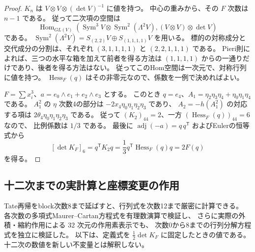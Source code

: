\begin{proof}
$K_n$ は $V\otimes V\otimes(\det V)^{-1}$ に値を持つ。
中心の重みから、その $F$ 次数は $n-1$ である。
従って二次項の空間は
\[
 \operatorname{Hom}_{GL(V)}
 \left(\operatorname{Sym}^3V\otimes
       \operatorname{Sym}^2(\Lambda^2V),
       (V\otimes V)\otimes\det V\right)
\]
である。
$\operatorname{Sym}^2(\Lambda^2V)=S_{(2,2)}V\oplus S_{(1,1,1,1)}V$ を用いる。
標的の対称成分と交代成分の分割は、それぞれ
$(3,1,1,1,1)$ と $(2,2,1,1,1)$ である。
Pieri則によれば、三つの水平な箱を加えて前者を得る方法は
$(1,1,1,1)$ からの一通りだけであり、後者を得る方法はない。
従ってこのHom空間は一次元で、対称行列に値を持つ。
$\operatorname{Hess}_F(q)$ はその非零元なので、係数を一例で決めればよい。

$F=\sum x_i^3$、$a=e_0\wedge e_1+e_2\wedge e_3$ とする。
このとき $q=e_4$、$A_1=\eta_2\eta_3\eta_4+\eta_0\eta_1\eta_4$ である。
$A_1^2$ の $\eta$ 次数4の部分は $-2x_4\eta_0\eta_1\eta_2\eta_3$ であり、
$A_2=-h(A_1^2)$ の対応する項は
$2\theta_4\eta_0\eta_1\eta_2\eta_3$ である。
従って $(K_2)_{44}=2$、一方 $(\operatorname{Hess}_F(q))_{44}=6$ なので、
比例係数は $1/3$ である。
最後に $\operatorname{adj}(-a)=q\,q^{\mathsf T}$ およびEulerの恒等式から
\[
 [\det K_F]_6=q^{\mathsf T}K_2q
 =\frac13q^{\mathsf T}\operatorname{Hess}_F(q)q=2F(q)
\]
を得る。
\end{proof}

\subsection{十二次までの実計算と座標変更の作用}
\label{subsec:v9-twelfth-jet}

Tate再帰をblock次数8まで延ばすと、行列式を次数12まで厳密に計算できる。
各次数の多項式Maurer--Cartan方程式を有理数演算で検証し、
さらに実際の外積・縮約作用による $32$ 次元の作用素表示でも、
次数0から8までの行列分解方程式を独立に検証した。
以下は、定義式を $\frac12\det K_F$ に固定したときの値である。
十二次の数値を新しい不変量とは解釈しない。

